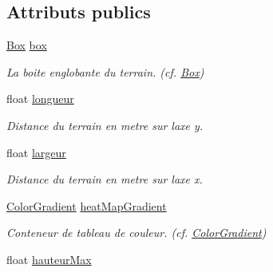 \subsection*{Attributs publics}
\begin{DoxyCompactItemize}
\item 
\hypertarget{class_terrain_ab31cb1bf848ab141c994897ee15858f5}{}\hyperlink{class_box}{Box} \hyperlink{class_terrain_ab31cb1bf848ab141c994897ee15858f5}{box}\label{class_terrain_ab31cb1bf848ab141c994897ee15858f5}

\begin{DoxyCompactList}\small\item\em La boite englobante du terrain. (cf. \hyperlink{class_box}{Box}) \end{DoxyCompactList}\item 
\hypertarget{class_terrain_ae25fe0ac0800f0e1c57c9b33f38f5a37}{}float \hyperlink{class_terrain_ae25fe0ac0800f0e1c57c9b33f38f5a37}{longueur}\label{class_terrain_ae25fe0ac0800f0e1c57c9b33f38f5a37}

\begin{DoxyCompactList}\small\item\em Distance du terrain en metre sur l\textquotesingle{}axe y. \end{DoxyCompactList}\item 
\hypertarget{class_terrain_a1153a4642fd691e7fe25f9af1faba132}{}float \hyperlink{class_terrain_a1153a4642fd691e7fe25f9af1faba132}{largeur}\label{class_terrain_a1153a4642fd691e7fe25f9af1faba132}

\begin{DoxyCompactList}\small\item\em Distance du terrain en metre sur l\textquotesingle{}axe x. \end{DoxyCompactList}\item 
\hypertarget{class_terrain_ab03b1edc97dc5d468eae0779bfcb805a}{}\hyperlink{class_color_gradient}{Color\+Gradient} \hyperlink{class_terrain_ab03b1edc97dc5d468eae0779bfcb805a}{heat\+Map\+Gradient}\label{class_terrain_ab03b1edc97dc5d468eae0779bfcb805a}

\begin{DoxyCompactList}\small\item\em Conteneur de tableau de couleur. (cf. \hyperlink{class_color_gradient}{Color\+Gradient}) \end{DoxyCompactList}\item 
\hypertarget{class_terrain_aad0e8c34a758f963efb3e4a89ba10cbc}{}float \hyperlink{class_terrain_aad0e8c34a758f963efb3e4a89ba10cbc}{hauteur\+Max}\label{class_terrain_aad0e8c34a758f963efb3e4a89ba10cbc}


\end{DoxyCompactItemize}
